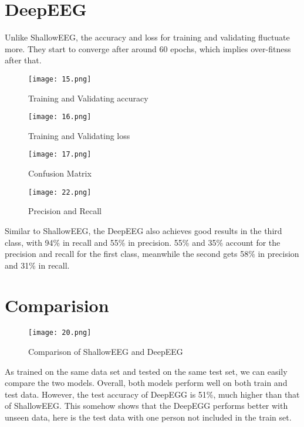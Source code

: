 \documentclass[]{report}
\begin{document}
\section{DeepEEG}
Unlike ShallowEEG, the accuracy and loss for training and validating fluctuate more. They start to converge after around 60 epochs, which implies over-fitness after that. 
\begin{figure}[H]
  \centering
  \begin{minipage}[b]{0.45\textwidth}
    \texttt{[image: 15.png]}
    \caption{Training and Validating accuracy}
  \end{minipage}
  \hfill
  \centering
  \begin{minipage}[b]{0.45\textwidth}
    \texttt{[image: 16.png]}
    \caption{Training and Validating loss}
  \end{minipage}
\end{figure}
\begin{figure}[H]
  \centering
  \begin{minipage}[b]{0.45\textwidth}
    \texttt{[image: 17.png]}
    \caption{Confusion Matrix}
  \end{minipage}
  \hfill
  \centering
  \begin{minipage}[b]{0.45\textwidth}
    \texttt{[image: 22.png]}
    \caption{Precision and Recall}
  \end{minipage}
\end{figure}
\noindent Similar to ShallowEEG, the DeepEEG also achieves good results in the third class, with 94\% in recall and 55\% in precision. 55\% and 35\% account for the precision and recall for the first class, meanwhile the second gets 58\% in precision and 31\% in recall. 
\section{Comparision}
\begin{figure}
    \centering
    \texttt{[image: 20.png]}
    \caption{Comparison of ShallowEEG and DeepEEG}
    \label{fig:enter-label}
\end{figure}
As trained on the same data set and tested on the same test set, we can easily compare the two models. Overall, both models perform well on both train and test data. However, the test accuracy of DeepEGG is 51\%, much higher than that of ShallowEEG. This somehow shows that the DeepEGG performs better with unseen data, here is the test data with one person not included in the train set. 
\end{document}
